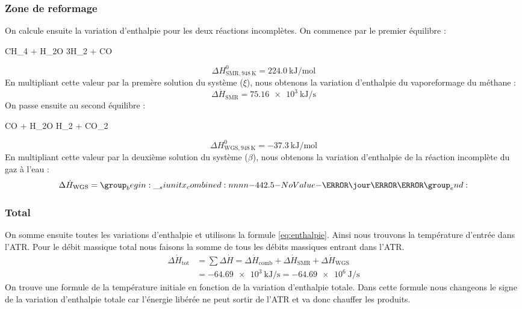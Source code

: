 \documentclass[french, a4paper, 10pt]{article}
\begin{document}
\subsubsection*{Zone de reformage}
On calcule ensuite la variation d'enthalpie pour les deux réactions incomplètes. On commence par le premier équilibre :
\begin{chemmath}
	CH_4 + H_2O \rightleftharpoons 3H_2 + CO
\end{chemmath}
\begin{equation*}\Delta H^0_{\text{SMR},\SI{948}{\kelvin}} = \SI{224.0}{\kilo\joule\per\mol}\end{equation*}
En multipliant cette valeur par la premère solution du système ($\xi$), nous obtenons la variation d'enthalpie du vaporeformage du méthane :
\begin{equation}\Delta\dot{H}_\text{SMR} = \SI{75.16e3}{\kilo\joule\per\second}\end{equation}
On passe ensuite au second équilibre :
\begin{chemmath}
	CO + H_2O \rightleftharpoons H_2 + CO_2
\end{chemmath}
\begin{equation*}\Delta H^0_{\text{WGS},\SI{948}{\kelvin}} = \SI{-37.3}{\kilo\joule\per\mol}\end{equation*}
En multipliant cette valeur par la deuxième solution du système ($\beta$), nous obtenons la variation d'enthalpie de la réaction incomplète du gaz à l'eau : 
\begin{equation}\Delta\dot{H}_\text{WGS} = \SI{-442.5}{\kilo\jour\per\second}\end{equation}

\subsubsection*{Total}
On somme ensuite toutes les variations d'enthalpie et utilisons la formule \ref{eq:enthalpie}. Ainsi nous trouvons la température d'entrée dans l'ATR. Pour le débit massique total nous faisons la somme de tous les débits massiques entrant dans l'ATR.
\begin{align}
	\Delta\dot{H}_\text{tot} &= \sum\Delta\dot{H} = \Delta\dot{H}_\text{comb} + \Delta\dot{H}_\text{SMR} + \Delta\dot{H}_\text{WGS}\\
							 &= \SI{-64.69e3}{\kilo\joule\per\second} = \SI{-64.69e6}{\joule\per\second}
\end{align}
On trouve une formule de la température initiale en fonction de la variation d'enthalpie totale. Dans cette formule nous changeons le signe de la variation d'enthalpie totale car l'énergie libérée ne peut sortir de l'ATR et va donc chauffer les produits.
\end{document}
